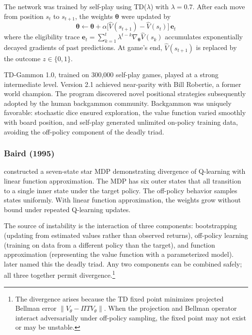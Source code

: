 The network was trained by self-play using TD($\lambda$) with $\lambda = 0.7$. After each move from position $s_t$ to $s_{t+1}$, the weights $\boldsymbol{\theta}$ were updated by
\begin{equation}
\boldsymbol{\theta} \leftarrow \boldsymbol{\theta} + \alpha \bigl[\hat{V}(s_{t+1}) - \hat{V}(s_t)\bigr] \, \mathbf{e}_t
\end{equation}
where the eligibility trace $\mathbf{e}_t = \sum_{k=1}^{t} \lambda^{t-k} \nabla_{\boldsymbol{\theta}} \hat{V}(s_k)$ accumulates exponentially decayed gradients of past predictions. At game's end, $\hat{V}(s_{t+1})$ is replaced by the outcome $z \in \{0, 1\}$.

TD-Gammon 1.0, trained on 300{,}000 self-play games, played at a strong intermediate level. Version 2.1 achieved near-parity with Bill Robertie, a former world champion. The program discovered novel positional strategies subsequently adopted by the human backgammon community. Backgammon was uniquely favorable: stochastic dice ensured exploration, the value function varied smoothly with board position, and self-play generated unlimited on-policy training data, avoiding the off-policy component of the deadly triad.

\subsubsection{Baird (1995)}

\citet{Baird1995} constructed a seven-state star MDP demonstrating divergence of Q-learning with linear function approximation. The MDP has six outer states that all transition to a single inner state under the target policy. The off-policy behavior samples states uniformly. With linear function approximation, the weights grow without bound under repeated Q-learning updates.

The source of instability is the interaction of three components: bootstrapping (updating from estimated values rather than observed returns), off-policy learning (training on data from a different policy than the target), and function approximation (representing the value function with a parameterized model). \citet{sutton2018} later named this the deadly triad. Any two components can be combined safely; all three together permit divergence.\footnote{The divergence arises because the TD fixed point minimizes projected Bellman error $\|V_\theta - \Pi T V_\theta\|$. When the projection and Bellman operator interact adversarially under off-policy sampling, the fixed point may not exist or may be unstable.}

